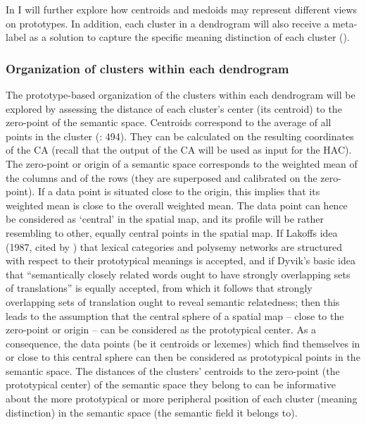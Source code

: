 In  I will further explore how centroids and medoids may represent different views on prototypes. In addition, each cluster in a dendrogram will also receive a meta-label as a solution to capture the specific meaning distinction of each cluster ().


\subsubsection{\label{sec:3.8.1.1}  Organization of clusters within each dendrogram}

The prototype-based organization of the clusters within each dendrogram will be explored by assessing the distance of each cluster’s center (its centroid) to the zero-point of the semantic space. Centroids correspond to the average of all points in the cluster (\citealt{tan_introduction_2006}: 494). They can be calculated on the resulting coordinates of the CA (recall that the output of the CA will be used as input for the HAC). The zero-point or origin of a semantic space corresponds to the weighted mean of the columns and of the rows (they are superposed and calibrated on the zero-point). If a data point is situated close to the origin, this implies that its weighted mean is close to the overall weighted mean. The data point can hence be considered as ‘central’ in the spatial map, and its profile will be rather resembling to other, equally central points in the spatial map. If Lakoffs idea (1987, cited by \citealt{tyler_semantics_2003}) that lexical categories and polysemy networks are structured with respect to their prototypical meanings is accepted, and if Dyvik’s basic idea that “semantically closely related words ought to have strongly overlapping sets of translations” is equally accepted, from which it follows that strongly overlapping sets of translation ought to reveal semantic relatedness; then this leads to the assumption that the central sphere of a spatial map – close to the zero-point or origin – can be considered as the prototypical center. As a consequence, the data points (be it centroids or lexemes) which find themselves in or close to this central sphere can then be considered as prototypical points in the semantic space. The distances of the clusters’ centroids to the zero-point (the prototypical center) of the semantic space they belong to can be informative about the more prototypical or more peripheral position of each cluster (meaning distinction) in the semantic space (the semantic field it belongs to).



